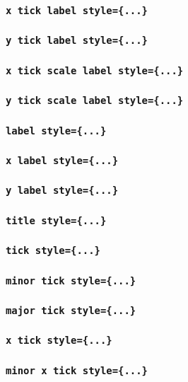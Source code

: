 \subsubsection{\texttt{x tick label style=\{...\}}}
\subsubsection{\texttt{y tick label style=\{...\}}}
\subsubsection{\texttt{x tick scale label style=\{...\}}}
\subsubsection{\texttt{y tick scale label style=\{...\}}}
\subsubsection{\texttt{label style=\{...\}}}
\subsubsection{\texttt{x label style=\{...\}}}
\subsubsection{\texttt{y label style=\{...\}}}
\subsubsection{\texttt{title style=\{...\}}}
\subsubsection{\texttt{tick style=\{...\}}}
\subsubsection{\texttt{minor tick style=\{...\}}}
\subsubsection{\texttt{major tick style=\{...\}}}
\subsubsection{\texttt{x tick style=\{...\}}}
\subsubsection{\texttt{minor x tick style=\{...\}}}
